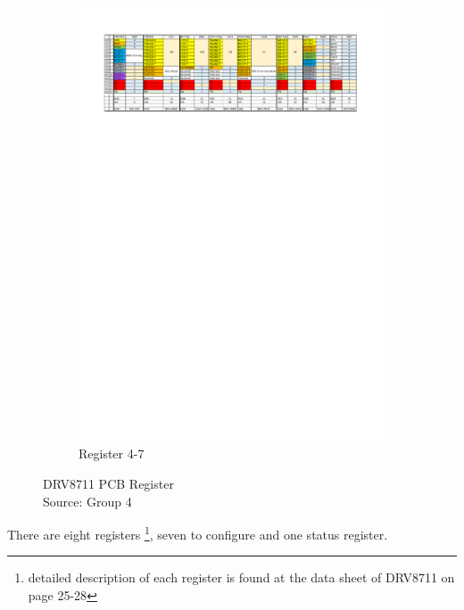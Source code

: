 \documentclass[a4paper,12pt]{scrreprt}
\begin{document}
\begin{figure} [H]
        \begin{subfigure}[b]{0.85\textwidth}
                \centering
                \includegraphics[width=1\textwidth]{pictures/spi_v0_0_2.pdf}
                \caption{Register 4-7}\label{fig:register 5-8}
        \end{subfigure}
        \caption[DRV8711 \acs{PCB} Registers]{DRV8711 \acs{PCB} Register \\
         Source: Group 4}\label{fig:DRV8711 registers}
  \end{figure}

There are eight registers \footnote{detailed description of each register is found at the data sheet of DRV8711 on page 25-28}, seven to configure and one status register. 
\end{document}
